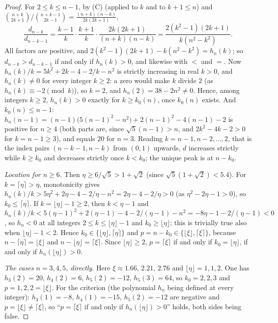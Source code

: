 \documentclass[11pt]{amsart}
\theoremstyle{definition}
\theoremstyle{remark}
\begin{document}
\begin{proof}
For $2\le k\le n-1$, by (C) (applied to $k$ and to $k+1\le n$) and
$\binom{n+k}{2k+1}/\binom{n+k-1}{2k-1}=\frac{(n+k)(n-k)}{2k(2k+1)}$,
\[
\frac{d_{n-k}}{d_{n-k-1}}=\frac{k-1}{k}\cdot\frac{k+1}{k}\cdot\frac{2k(2k+1)}{(n+k)(n-k)}
=\frac{2(k^2-1)(2k+1)}{k(n^2-k^2)} .
\]
All factors are positive, and $2(k^2-1)(2k+1)-k(n^2-k^2)=h_n(k)$; so
$d_{n-k}>d_{n-k-1}$ if and only if $h_n(k)>0$, and likewise with $<$ and $=$.
Now $h_n(k)/k=5k^2+2k-4-2/k-n^2$ is strictly increasing in real $k>0$, and
$h_n(k)\ne0$ for every integer $k\ge2$: a zero would make $k$ divide $2$
(as $h_n(k)\equiv-2\pmod k$), so $k=2$, and $h_n(2)=38-2n^2\ne0$. Hence,
among integers $k\ge2$, $h_n(k)>0$ exactly for $k\ge k_0(n)$, once $k_0(n)$
exists. And $k_0(n)\le n-1$:
$h_n(n-1)=(n-1)\bigl(5(n-1)^2-n^2\bigr)+2(n-1)^2-4(n-1)-2$ is positive for
$n\ge4$ (both parts are, since $\sqrt5(n-1)>n$, and $2k^2-4k-2>0$ for
$k=n-1\ge3$), and equals $20$ for $n=3$. Reading $k=n-1,n-2,\dots,2$, that is
the index pairs $(n-k-1,n-k)$ from $(0,1)$ upwards, $d$ increases strictly
while $k\ge k_0$ and decreases strictly once $k<k_0$; the unique peak is at
$n-k_0$.

\emph{Location for $n\ge6$.} Then $\eta\ge6/\sqrt5>1+\sqrt2$ (since
$\sqrt5(1+\sqrt2)<5.4$). For $k=\lceil \eta\rceil>\eta$, monotonicity gives
$h_n(k)/k>5\eta^2+2\eta-4-2/\eta-n^2=2\eta-4-2/\eta>0$ (as $\eta^2-2\eta-1>0$), so
$k_0\le\lceil \eta\rceil$. If $k=\lfloor \eta\rfloor-1\ge2$, then $k<\eta-1$ and
$h_n(k)/k<5(\eta-1)^2+2(\eta-1)-4-2/(\eta-1)-n^2=-8\eta-1-2/(\eta-1)<0$, so $h_n<0$ at all
integers $2\le k\le\lfloor \eta\rfloor-1$ and $k_0\ge\lfloor \eta\rfloor$; this is
trivially true also when $\lfloor \eta\rfloor-1<2$. Hence
$k_0\in\{\lfloor \eta\rfloor,\lceil \eta\rceil\}$ and
$p=n-k_0\in\{\lfloor \xi\rfloor,\lceil \xi\rceil\}$, because
$n-\lceil \eta\rceil=\lfloor \xi\rfloor$ and $n-\lfloor \eta\rfloor=\lceil \xi\rceil$.
Since $\lfloor \eta\rfloor\ge2$, $p=\lceil \xi\rceil$ if and only if
$k_0=\lfloor \eta\rfloor$, if and only if $h_n(\lfloor \eta\rfloor)>0$.

\emph{The cases $n=3,4,5$, directly.} Here $\xi\approx1.66,\,2.21,\,2.76$ and
$\lfloor \eta\rfloor=1,1,2$. One has $h_3(2)=20$, $h_4(2)=6$, $h_5(2)=-12$,
$h_5(3)=64$, so $k_0=2,2,3$ and $p=1,2,2=\lfloor \xi\rfloor$. For the criterion
(the polynomial $h_n$ being defined at every integer):
$h_3(1)=-8$, $h_4(1)=-15$, $h_5(2)=-12$ are negative and $p=\lfloor \xi\rfloor\ne\lceil \xi\rceil$,
so ``$p=\lceil \xi\rceil$ if and only if $h_n(\lfloor \eta\rfloor)>0$'' holds, both
sides being false.
\end{proof}
\end{document}
